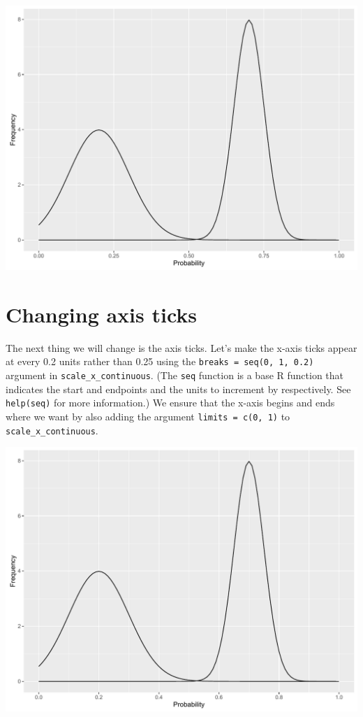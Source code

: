 \begin{center}\includegraphics[width=0.55\linewidth]{figures/function_5-1} \end{center}

\section{Changing axis ticks}\label{changing-axis-ticks-2}

The next thing we will change is the axis ticks. Let's make the x-axis
ticks appear at every 0.2 units rather than 0.25 using the
\texttt{breaks\ =\ seq(0,\ 1,\ 0.2)} argument in
\texttt{scale\_x\_continuous}. (The \texttt{seq} function is a base R
function that indicates the start and endpoints and the units to
increment by respectively. See \texttt{help(seq)} for more information.)
We ensure that the x-axis begins and ends where we want by also adding
the argument \texttt{limits\ =\ c(0,\ 1)} to
\texttt{scale\_x\_continuous}.

\begin{Shaded}
\begin{Highlighting}[]
\StringTok{ }\StringTok{ }\NormalTok{(} \NormalTok{,}
\StringTok{        } \NormalTok{(}\NormalTok{, }\NormalTok{, }\NormalTok{),}\NormalTok{(}\NormalTok{, }\NormalTok{)) +}
\StringTok{      }\NormalTok{(} \NormalTok{)}
\end{Highlighting}
\end{Shaded}

\begin{center}\includegraphics[width=0.55\linewidth]{figures/function_6-1} \end{center}


